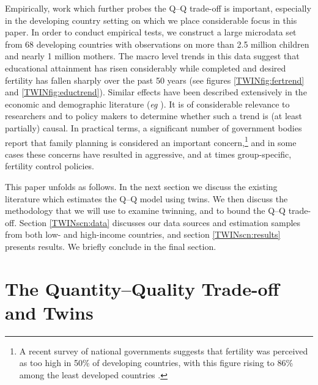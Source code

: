 Empirically, work which further probes the Q--Q trade-off is important,
especially in the developing country setting on which we place considerable 
focus in this paper. In order to conduct empirical tests, we construct a large 
microdata set from 68 developing countries with observations on more than 2.5 
million children and nearly 1 million mothers. The macro level trends in this 
data suggest that educational attainment has risen considerably while completed 
and desired fertility has fallen sharply over the past 50 years (see figures 
\ref{TWINfig:fertrend} and \ref{TWINfig:eductrend}). Similar effects have been 
described extensively in the economic and demographic literature (\emph{eg} 
\citet{Hanushek1992}). It is of considerable relevance to researchers and to 
policy makers to determine whether such a trend is (at least partially) causal.
In practical terms, a significant number of government bodies report that
family planning is considered an important concern,\footnote{A recent survey of 
national governments suggests that fertility was perceived as too high in 50\% 
of developing countries, with this figure rising to 86\% among the least 
developed countries \citet{UN2010}.}  and in some cases these concerns have 
resulted in aggressive, and at times group-specific, fertility control 
policies.  %

This paper unfolds as follows. In the next section we discuss the existing 
literature which estimates the Q--Q model using twins. We then discuss the 
methodology that we will use to examine twinning, and to bound the Q--Q 
trade-off.  Section \ref{TWINscn:data} discusses our data sources and 
estimation samples from both low- and high-income countries, and section 
\ref{TWINscn:results} presents results. We briefly conclude in the final 
section.

\section{The Quantity--Quality Trade-off and Twins}   \label{TWINscn:literature}

